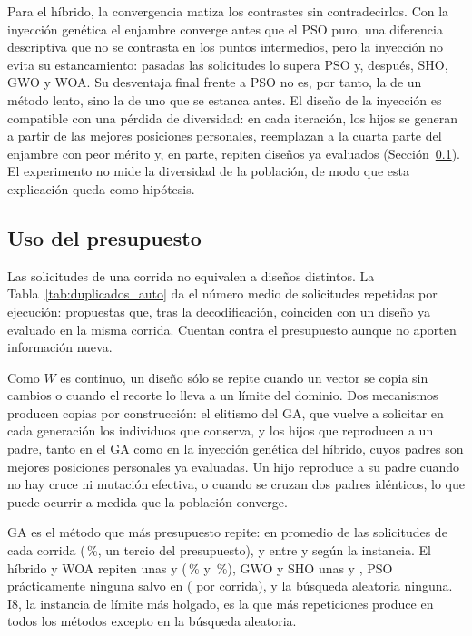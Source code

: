 Para el híbrido, la convergencia matiza los contrastes sin contradecirlos. Con la inyección genética el enjambre converge antes que el PSO puro, una diferencia descriptiva que no se contrasta en los puntos intermedios, pero la inyección no evita su estancamiento: pasadas las \ConvControlLeadTo{} solicitudes lo supera PSO y, después, SHO, GWO y WOA. Su desventaja final frente a PSO no es, por tanto, la de un método lento, sino la de uno que se estanca antes. El diseño de la inyección es compatible con una pérdida de diversidad: en cada iteración, los hijos se generan a partir de las mejores posiciones personales, reemplazan a la cuarta parte del enjambre con peor mérito y, en parte, repiten diseños ya evaluados (Sección~\ref{sec:uso_presupuesto}). El experimento no mide la diversidad de la población, de modo que esta explicación queda como hipótesis.

\subsection{Uso del presupuesto}
\label{sec:uso_presupuesto}

Las \RequestsPerRun{} solicitudes de una corrida no equivalen a \RequestsPerRun{} diseños distintos. La Tabla~\ref{tab:duplicados_auto} da el número medio de solicitudes repetidas por ejecución: propuestas que, tras la decodificación, coinciden con un diseño ya evaluado en la misma corrida. Cuentan contra el presupuesto aunque no aporten información nueva.

\TablaDuplicadosAuto

Como $W$ es continuo, un diseño sólo se repite cuando un vector se copia sin cambios o cuando el recorte lo lleva a un límite del dominio. Dos mecanismos producen copias por construcción: el elitismo del GA, que vuelve a solicitar en cada generación los individuos que conserva, y los hijos que reproducen a un padre, tanto en el GA como en la inyección genética del híbrido, cuyos padres son mejores posiciones personales ya evaluadas. Un hijo reproduce a su padre cuando no hay cruce ni mutación efectiva, o cuando se cruzan dos padres idénticos, lo que puede ocurrir a medida que la población converge.

GA es el método que más presupuesto repite: en promedio \DupGaMean{} de las \RequestsPerRun{} solicitudes de cada corrida (\DupGaPct\,\%, un tercio del presupuesto), y entre \DupGaMin{} y \DupGaMax{} según la instancia. El híbrido y WOA repiten unas \DupPsoGaMean{} y \DupWoaMean{} (\DupPsoGaPct\,\% y \DupWoaPct\,\%), GWO y SHO unas \DupGwoMean{} y \DupShoMean{}, PSO prácticamente ninguna salvo en \DupPsoMaxInstance{} (\DupPsoMax{} por corrida), y la búsqueda aleatoria ninguna. I8, la instancia de límite más holgado, es la que más repeticiones produce en todos los métodos excepto en la búsqueda aleatoria.

